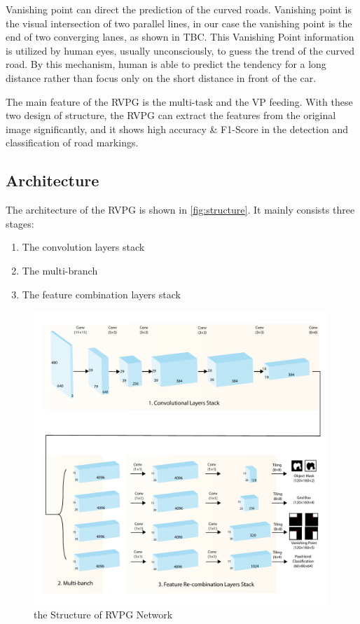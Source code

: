\begin{spacing}{1.5}
Vanishing point can direct the prediction of the curved roads. Vanishing point is the visual intersection of two parallel lines, in our case the vanishing point is the end of two converging lanes, as shown in TBC. This Vanishing Point information is utilized by human eyes, usually unconsciously, to guess the trend of the curved road. By this mechanism, human is able to predict the tendency for a long distance rather than focus only on the short distance in front of the car.

The main feature of the RVPG is the multi-task and the VP feeding. With these two design of structure, the RVPG can extract the features from the original image significantly, and it shows high accuracy \& F1-Score in the detection and classification of road markings.

\subsection{Architecture}

The architecture of the RVPG is shown in \autoref{fig:structure}. It mainly consists three stages:

\begin{enumerate} \vspace{-5mm}
    \item The convolution layers stack
    \item The multi-branch
    \item The feature combination layers stack
\end{enumerate} \vspace{-5mm}

\begin{figure}[ht]
\centering
\includegraphics[width=0.99\textwidth, fbox]{Chapter3/structure.pdf}
\caption{the Structure of RVPG Network}
\label{fig:structure} 
\end{figure}


\end{spacing}
